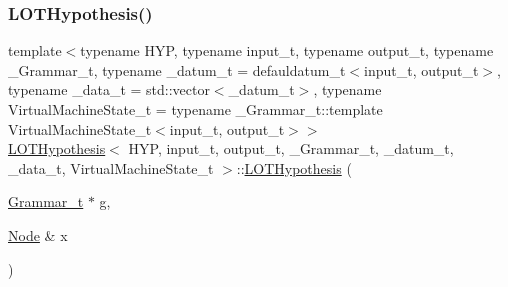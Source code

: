 \mbox{\label{class_l_o_t_hypothesis_a877ff1340bdf69fa2d9ed290c70f1cfb}} 
\subsubsection{\texorpdfstring{L\+O\+T\+Hypothesis()}{LOTHypothesis()}\hspace{0.1cm}{\footnotesize\ttfamily [3/4]}}
{\footnotesize\ttfamily template$<$typename H\+YP, typename input\+\_\+t, typename output\+\_\+t, typename \+\_\+\+Grammar\+\_\+t, typename \+\_\+datum\+\_\+t = defauldatum\+\_\+t$<$input\+\_\+t, output\+\_\+t$>$, typename \+\_\+data\+\_\+t = std\+::vector$<$\+\_\+datum\+\_\+t$>$, typename Virtual\+Machine\+State\+\_\+t = typename \+\_\+\+Grammar\+\_\+t\+::template Virtual\+Machine\+State\+\_\+t$<$input\+\_\+t, output\+\_\+t$>$$>$ \\
\hyperlink{class_l_o_t_hypothesis}{L\+O\+T\+Hypothesis}$<$ H\+YP, input\+\_\+t, output\+\_\+t, \+\_\+\+Grammar\+\_\+t, \+\_\+datum\+\_\+t, \+\_\+data\+\_\+t, Virtual\+Machine\+State\+\_\+t $>$\+::\hyperlink{class_l_o_t_hypothesis}{L\+O\+T\+Hypothesis} (\begin{DoxyParamCaption}\item[{\hyperlink{class_l_o_t_hypothesis_a8006204013d471860e54c49d19edbace}{Grammar\+\_\+t} $\ast$}]{g,  }\item[{\hyperlink{class_node}{Node} \&}]{x }\end{DoxyParamCaption})\hspace{0.3cm}{\ttfamily [inline]}}

\mbox{\label{class_l_o_t_hypothesis_a9361067f4f283bc21f77eee178965b39}} 
